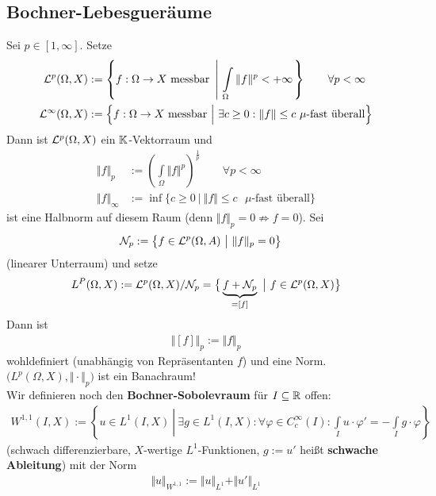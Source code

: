 \subsection*{Bochner-Lebesgueräume}
Sei $p\in[1,\infty]$. Setze
\begin{align*}
	\mathcal{L}^p(\Omega,X)&:=\left\lbrace f:\Omega\to X\text{ messbar }\left|~\int\limits_\Omega\Vert f\Vert^p<+\infty\right.\right\rbrace\qquad\forall p<\infty\\
	\mathcal{L}^\infty(\Omega,X)&:=\Big\lbrace f:\Omega\to X\text{ messbar }\Big|~\exists   c\geq0:\Vert f\Vert\leq c\text{ $\mu$-fast überall}\Big\rbrace
\end{align*}
Dann ist $\mathcal{L}^p(\Omega,X)$ ein $\mathbb{K}$-Vektorraum und 
\begin{align*}
	\Vert f\Vert_p&:=\left(\int\limits_\Omega\Vert f\Vert^p\right)^{\frac{1}{p}}\qquad\forall p<\infty\\
	\Vert f\Vert_\infty&:=\inf\limits\big\lbrace c\geq 0~\big|~\Vert f\Vert\leq c\text{ $\mu$-fast überall}\big\rbrace
\end{align*}
ist eine Halbnorm auf diesem Raum (denn $\Vert f\Vert_p=0\not\Rightarrow f=0$). 
Sei
\begin{align*}
	\mathcal{N}_p&:=\big\lbrace f\in \mathcal{L}^p(\Omega,A)~\big|~\Vert f\Vert_p=0\big\rbrace
\end{align*}
(linearer Unterraum) und setze
\begin{align*}
	L^P(\Omega,X):=\mathcal{L}^p(\Omega,X)/\mathcal{N}_p
	=\big\lbrace \underbrace{f+\mathcal{N}_p}_{=[f]}~\big|~f\in\mathcal{L}^p(\Omega,X)\big\rbrace
\end{align*}
Dann ist
\begin{align*}
	\big\Vert[f]\big\Vert_p:=\Vert f\Vert_p
\end{align*}
wohldefiniert (unabhängig von Repräsentanten $f$) und eine Norm. 
$\big(L^p(\Omega,X),\Vert\cdot\Vert_p\big)$ ist ein  Banachraum!\\
Wir definieren noch den \textbf{Bochner-Sobolevraum} für $I\subseteq\mathbb{R}$ offen:
\begin{align*}
	W^{1,1}(I,X):=\left\lbrace u\in L^1(I,X)~\left|~\exists g\in L^1(I,X):\forall\varphi\in C_c^\infty(I):\int\limits_I u\cdot\varphi'=-\int\limits_I g\cdot\varphi\right.\right\rbrace
\end{align*}
(schwach differenzierbare, $X$-wertige $L^1$-Funktionen, $g:=u'$ heißt \textbf{schwache Ableitung}) mit der Norm
\begin{align*}
	\Vert u\Vert_{W^{1,1}}:=\Vert u\Vert_{L^1}+\Vert u'\Vert_{L^1}
\end{align*}
